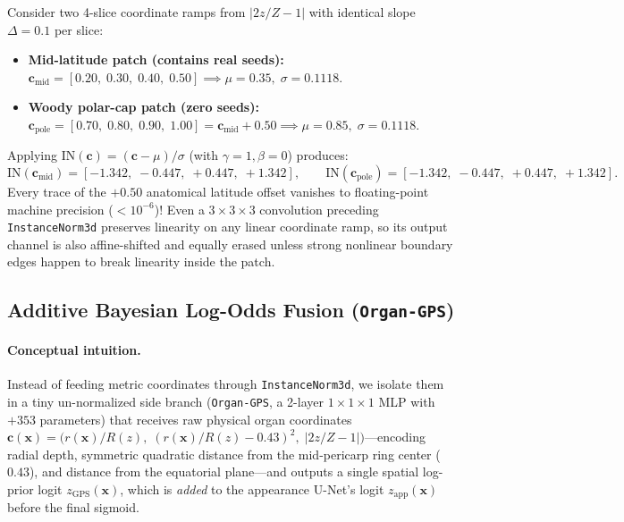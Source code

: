 \documentclass[10pt,a4paper]{article}
\renewcommand{\_}{\origunderscore\allowbreak}
\begin{document}
\begin{tcolorbox}[enhanced, colback=lightgray, colframe=uibblue!70, arc=2pt, left=7pt, right=7pt, top=5pt, bottom=5pt,
  title={\textbf{Worked Numerical Example: Bit-Identical Coordinate Collapse Under \texttt{InstanceNorm3d}}}]
Consider two 4-slice coordinate ramps from $|2z/Z - 1|$ with identical slope $\Delta = 0.1$ per slice:
\begin{itemize}[itemsep=1pt, topsep=2pt]
    \item \textbf{Mid-latitude patch (contains real seeds):} $\mathbf{c}_{\text{mid}} = [0.20,\; 0.30,\; 0.40,\; 0.50] \implies \mu = 0.35,\; \sigma = 0.1118$.
    \item \textbf{Woody polar-cap patch (zero seeds):} $\mathbf{c}_{\text{pole}} = [0.70,\; 0.80,\; 0.90,\; 1.00] = \mathbf{c}_{\text{mid}} + 0.50 \implies \mu = 0.85,\; \sigma = 0.1118$.
\end{itemize}
Applying $\text{IN}(\mathbf{c}) = (\mathbf{c} - \mu)/\sigma$ (with $\gamma=1,\beta=0$) produces:
\[
    \text{IN}(\mathbf{c}_{\text{mid}}) = [-1.342,\; -0.447,\; +0.447,\; +1.342], \qquad
    \text{IN}(\mathbf{c}_{\text{pole}}) = [-1.342,\; -0.447,\; +0.447,\; +1.342].
\]
Every trace of the $+0.50$ anatomical latitude offset vanishes to floating-point machine precision ($<10^{-6}$)! Even a $3\times 3\times 3$ convolution preceding \texttt{InstanceNorm3d} preserves linearity on any linear coordinate ramp, so its output channel is also affine-shifted and equally erased unless strong nonlinear boundary edges happen to break linearity inside the patch.
\end{tcolorbox}

\subsection{Additive Bayesian Log-Odds Fusion (\texttt{Organ-GPS})}
\label{app:bayes_logodds}

\paragraph{Conceptual intuition.} Instead of feeding metric coordinates through \texttt{InstanceNorm3d}, we isolate them in a tiny un-normalized side branch (\texttt{Organ-GPS}, a 2-layer $1\times 1\times 1$ MLP with $+353$ parameters) that receives raw physical organ coordinates $\mathbf{c}(\mathbf{x}) = \bigl(r(\mathbf{x})/R(z),\; (r(\mathbf{x})/R(z) - 0.43)^2,\; |2z/Z - 1|\bigr)$---encoding radial depth, symmetric quadratic distance from the mid-pericarp ring center ($0.43$), and distance from the equatorial plane---and outputs a single spatial log-prior logit $z_{\text{GPS}}(\mathbf{x})$, which is \emph{added} to the appearance U-Net's logit $z_{\text{app}}(\mathbf{x})$ before the final sigmoid.
\end{document}
